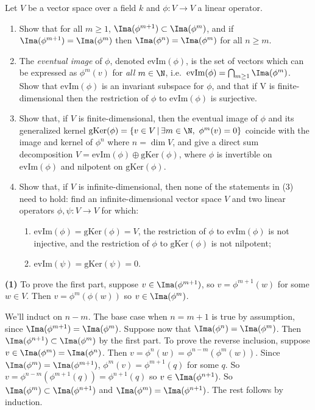 \begin{problem}
Let $V$ be a vector space over a field $k$ and $\phi:V\to V$ a linear operator. 
\begin{enumerate}
  \item Show that for all $m\geq 1$, $\Ima(\phi^{m+1})\subset \Ima(\phi^m)$, and if $\Ima(\phi^{m+1})=\Ima(\phi^m)$ then $\Ima(\phi^n)=\Ima(\phi^m)$ for all $n\geq m$. 
  \item The {\em eventual image} of $\phi$, denoted $\mathrm{ev Im}(\phi)$, is the set of vectors which can be expressed as $\phi^m(v)$ for {\em all} $m\in\N$, i.e.\ $\mathrm{ev Im}(\phi)=\bigcap_{m\geq 1} \Ima(\phi^m)$. Show that $\mathrm{ev Im}(\phi)$ is an invariant subspace for $\phi$, and that if V is finite-dimensional then the restriction of $\phi$ to $\mathrm{ev Im}(\phi)$ is surjective.
  \item Show that, if $V$ is finite-dimensional, then the eventual image of $\phi$ and its generalized kernel $\mathrm{gKer}(\phi)=\{v\in V\,|\, \exists m\in \N,\ \phi^m(v)=0\}$ coincide with the image and kernel of $\phi^n$ where $n=\dim V$, and give a direct sum decomposition $V=\mathrm{evIm}(\phi)\oplus \mathrm{gKer}(\phi)$, where $\phi$ is invertible on $\mathrm{evIm}(\phi)$ and nilpotent on $\mathrm{gKer}(\phi)$.
  \item Show that, if $V$ is infinite-dimensional, then none of the statements in (3) need to hold: find an infinite-dimensional vector space $V$ and two linear operators $\phi,\psi:V\to V$ for which:
  \begin{enumerate}
    \item $\mathrm{evIm}(\phi)=\mathrm{gKer}(\phi)=V$, the restriction of $\phi$ to $\mathrm{evIm}(\phi)$ is not injective, and the restriction of $\phi$ to $\mathrm{gKer}(\phi)$ is not nilpotent;
    \item $\mathrm{evIm}(\psi)=\mathrm{gKer}(\psi)=0$.
  \end{enumerate}
\end{enumerate}
\end{problem}

\textbf{(1)} To prove the first part, suppose $v\in\Ima(\phi^{m+1})$, so $v=\phi^{m+1}(w)$ for some $w\in V$. Then $v=\phi^m(\phi(w))$ so $v\in \Ima(\phi^m)$. 

We'll induct on $n-m$. The base case when $n=m+1$ is true by assumption, since $\Ima(\phi^{m+1})=\Ima(\phi^m)$. Suppose now that $\Ima(\phi^n)=\Ima(\phi^m)$. Then $\Ima(\phi^{n+1})\subset \Ima(\phi^m)$ by the first part. To prove the reverse inclusion, suppose $v\in \Ima(\phi^m)=\Ima(\phi^n)$. Then $v=\phi^n(w)=\phi^{n-m}(\phi^m(w))$. Since $\Ima(\phi^m)=\Ima(\phi^{m+1})$, $\phi^m(v)=\phi^{m+1}(q)$ for some $q$. So $v=\phi^{n-m}(\phi^{m+1}(q))=\phi^{n+1}(q)$ so $v\in \Ima(\phi^{n+1})$. So $\Ima(\phi^m)\subset \Ima(\phi^{n+1})$ and $\Ima(\phi^m)= \Ima(\phi^{n+1})$. The rest follows by induction.               

